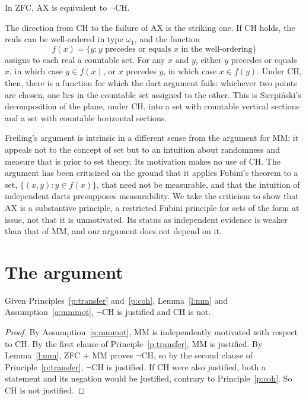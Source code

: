 \documentclass{situationist-preprint}
\begin{document}
\begin{lemma}\label{l:ax}
In ZFC, $\mathrm{AX}$ is equivalent to $\neg$CH.
\end{lemma}

The direction from CH to the failure of AX is the striking one. If CH holds, the reals can be well-ordered in type $\omega_1$, and the function
\[ f(x) = \{y : y \text{ precedes or equals } x \text{ in the well-ordering}\} \]
assigns to each real a countable set. For any $x$ and $y$, either $y$ precedes or equals $x$, in which case $y \in f(x)$, or $x$ precedes $y$, in which case $x \in f(y)$. Under CH, then, there is a function for which the dart argument fails: whichever two points are chosen, one lies in the countable set assigned to the other. This is Sierpiński's decomposition of the plane, under CH, into a set with countable vertical sections and a set with countable horizontal sections.

Freiling's argument is intrinsic in a different sense from the argument for MM: it appeals not to the concept of set but to an intuition about randomness and measure that is prior to set theory. Its motivation makes no use of CH. The argument has been criticized on the ground that it applies Fubini's theorem to a set, $\{(x,y) : y \in f(x)\}$, that need not be measurable, and that the intuition of independent darts presupposes measurability. We take the criticism to show that AX is a substantive principle, a restricted Fubini principle for sets of the form at issue, not that it is unmotivated. Its status as independent evidence is weaker than that of MM, and our argument does not depend on it.

\section{The argument}\label{s:argument}

\begin{theorem}\label{t:main}
Given Principles~\ref{p:transfer} and~\ref{p:coh}, Lemma~\ref{l:mm} and Assumption~\ref{a:mmmot}, $\neg$CH is justified and CH is not.
\end{theorem}

\begin{proof}
By Assumption~\ref{a:mmmot}, MM is independently motivated with respect to CH. By the first clause of Principle~\ref{p:transfer}, MM is justified. By Lemma~\ref{l:mm}, ZFC $+$ MM proves $\neg$CH, so by the second clause of Principle~\ref{p:transfer}, $\neg$CH is justified. If CH were also justified, both a statement and its negation would be justified, contrary to Principle~\ref{p:coh}. So CH is not justified.
\end{proof}
\end{document}
